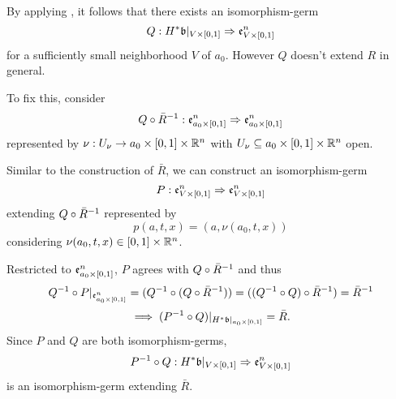 \begin{myproof}
    By applying ,
    it follows that there exists an isomorphism-germ
    \[ Q: H^*\mathfrak{b}\vert_{V \times{} [0, 1]} \Rightarrow{} \mathfrak{e}^{n}_{V \times{} [0, 1]} \]
    for a sufficiently small neighborhood $V$ of $a_0$.
    However $Q$ doesn't extend $R$ in general.

    To fix this, consider
    \[ Q \circ \bar{R}^{-1}: \mathfrak{e}^{n}_{a_0 \times{} [0, 1]} \Rightarrow{} \mathfrak{e}^{n}_{a_0 \times{} [0, 1]} \]
    represented by $\nu: U_\nu \to a_0 \times{} [0, 1] \times \mathbb{R}^n$
    with $U_\nu \subseteq{} a_0 \times{} [0, 1] \times \mathbb{R}^n$ open.

    Similar to the construction of $\bar{R}$, we can construct an isomorphism-germ
    \[ P: \mathfrak{e}^{n}_{V \times{} [0, 1]} \Rightarrow{} \mathfrak{e}^{n}_{V \times{} [0, 1]} \]
    extending $Q \circ \bar{R}^{-1}$ represented by
    \[ p(a, t, x) = (a, \nu(a_0, t, x)) \]
    considering $\nu(a_0, t, x) \in [0, 1] \times \mathbb{R}^n$.

    Restricted to $\mathfrak{e}^{n}_{a_0 \times{} [0, 1]}$, $P$ agrees with $Q \circ \bar{R}^{-1}$ and thus
    \[
        Q^{-1} \circ P\vert_{\mathfrak{e}^{n}_{a_0 \times{} [0, 1]}}
        = (Q^{-1} \circ (Q \circ \bar{R}^{-1}))
        = ((Q^{-1} \circ Q) \circ \bar{R}^{-1})
        = \bar{R}^{-1}
    \]
    \[ \implies (P^{-1} \circ Q)\vert_{H^*\mathfrak{b}\vert_{a_0 \times{} [0, 1]}} = \bar{R}. \]
    Since $P$ and $Q$ are both isomorphism-germs,
    \[ P^{-1} \circ Q: H^*\mathfrak{b}\vert_{V \times{} [0, 1]} \Rightarrow{} \mathfrak{e}^{n}_{V \times{} [0, 1]} \]
    is an isomorphism-germ extending $\bar{R}$.
\end{myproof}

\begin{myproof}
\end{myproof}